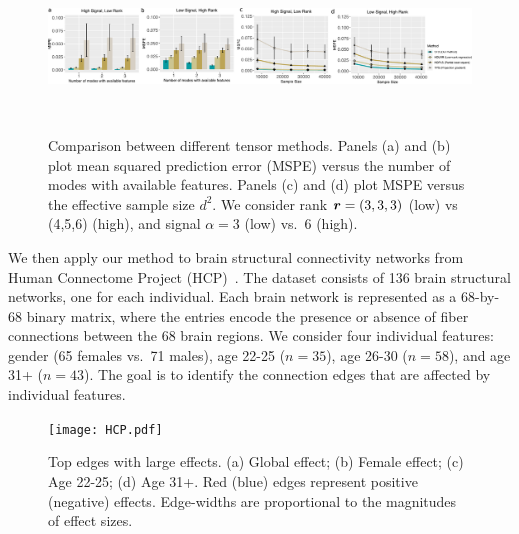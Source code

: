 \documentclass{article}
\theoremstyle{definition}
\theoremstyle{definition}
\begin{document}
\begin{figure}[ht]
\centering
\includegraphics[width=14cm]{compare_alternative_w.pdf} 
\vspace{-.5cm}
\caption{\small Comparison between different tensor methods. Panels (a) and (b) plot mean squared prediction error (MSPE) versus the number of modes with available features. Panels (c) and (d) plot MSPE versus the effective sample size $d^2$. We consider rank $\bm{r}=(3,3,3)$ (low) vs (4,5,6)
 (high), and signal $\alpha =3 $ (low) vs.\ 6 (high).}~\label{fig:compare}
\vspace{-.5cm}
\end{figure}



We then apply our method to brain structural connectivity networks from Human Connectome Project (HCP)~\citep{HCP}. %
The dataset consists of 136 brain structural networks, one for each individual. Each brain network is represented as a 68-by-68 binary matrix, where the entries encode the presence or absence of fiber connections between the 68 brain regions. We consider four individual features: gender (65 females vs.\ 71 males), age 22-25 ($n=35$), age 26-30 ($n=58$), and age 31+ ($n=43$). The goal is to identify the connection edges that are affected by individual features. 

\begin{figure}[!h]
\centering
\texttt{[image: HCP.pdf]}
\vspace{-.5cm}
\caption{\small Top edges with large effects. (a) Global effect; (b) Female effect; (c) Age 22-25; (d) Age 31+. Red (blue) edges represent positive (negative) effects. Edge-widths are proportional to the magnitudes of effect sizes.
}\label{fig:brain}
\vspace{-.2cm}
\end{figure}
\end{document}
